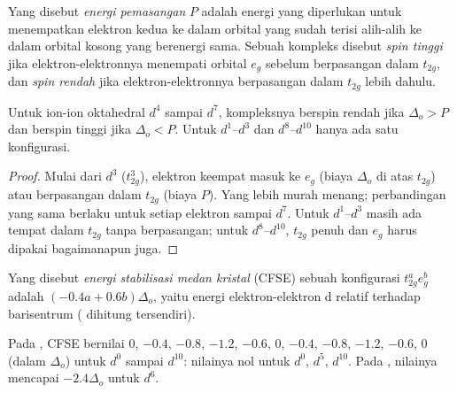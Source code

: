 \begin{definition}\label{def:b2:ligand-field:spin}
Yang disebut \emph{energi pemasangan} $P$ adalah
energi yang diperlukan untuk menempatkan elektron kedua ke dalam orbital
yang sudah terisi alih-alih ke dalam orbital kosong yang berenergi sama.
Sebuah kompleks disebut \emph{spin tinggi} jika
elektron-elektronnya menempati orbital $e_g$ sebelum berpasangan dalam
$t_{2g}$, dan \emph{spin rendah} jika
elektron-elektronnya berpasangan dalam $t_{2g}$ lebih dahulu.
\end{definition}

\begin{proposition}\label{prop:b2:ligand-field:spin-state}
Untuk ion-ion oktahedral $d^4$ sampai $d^7$, kompleksnya berspin rendah jika
$\Delta_o > P$ dan berspin tinggi jika $\Delta_o < P$. Untuk $d^1$--$d^3$ dan
$d^8$--$d^{10}$ hanya ada satu konfigurasi.
\end{proposition}

\begin{proof}
Mulai dari $d^3$ ($t_{2g}^3$), elektron keempat masuk ke $e_g$ (biaya $\Delta_o$ di atas
$t_{2g}$) atau berpasangan dalam $t_{2g}$ (biaya $P$). Yang lebih murah
menang; perbandingan yang sama berlaku untuk setiap elektron sampai $d^7$.
Untuk $d^1$--$d^3$ masih ada tempat dalam $t_{2g}$ tanpa berpasangan;
untuk $d^8$--$d^{10}$, $t_{2g}$ penuh dan $e_g$ harus dipakai bagaimanapun juga.
\end{proof}

\begin{definition}\label{def:b2:ligand-field:cfse}
Yang disebut \emph{energi stabilisasi medan kristal}
(CFSE) sebuah konfigurasi $t_{2g}^ae_g^b$ adalah $(-0.4a + 0.6b)\Delta_o$, yaitu
energi elektron-elektron d relatif terhadap barisentrum (
dihitung tersendiri).
\end{definition}

\begin{proposition}\label{prop:b2:ligand-field:cfse}
Pada , CFSE bernilai $0$, $-0.4$, $-0.8$, $-1.2$, $-0.6$, $0$, $-0.4$, $-0.8$, $-1.2$,
$-0.6$, $0$ (dalam $\Delta_o$) untuk $d^0$ sampai $d^{10}$: nilainya nol untuk $d^0$,
$d^5$, $d^{10}$. Pada , nilainya mencapai $-2.4\Delta_o$ untuk $d^6$.
\end{proposition}

